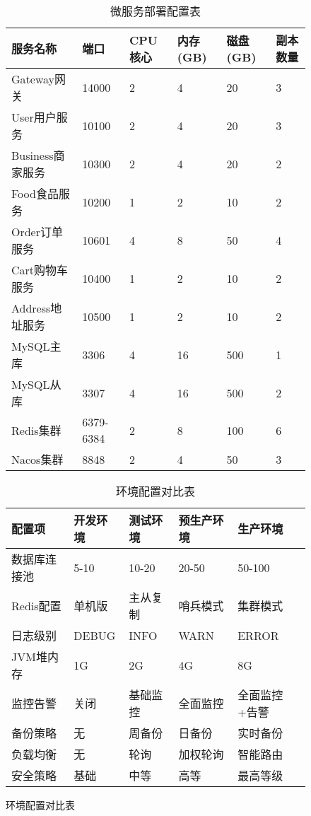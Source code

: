 \documentclass[a4paper,12pt]{article}
\begin{document}
\begin{figure}[H]
\begin{table}[H]
\centering
\caption{微服务部署配置表}
\begin{tabular}{|p{2.5cm}|p{1.5cm}|p{2cm}|p{2cm}|p{2cm}|p{3cm}|}
\hline
\textbf{服务名称} & \textbf{端口} & \textbf{CPU核心} & \textbf{内存(GB)} & \textbf{磁盘(GB)} & \textbf{副本数量} \\
\hline
Gateway网关 & 14000 & 2 & 4 & 20 & 3 \\
\hline
User用户服务 & 10100 & 2 & 4 & 20 & 3 \\
\hline
Business商家服务 & 10300 & 2 & 4 & 20 & 2 \\
\hline
Food食品服务 & 10200 & 1 & 2 & 10 & 2 \\
\hline
Order订单服务 & 10601 & 4 & 8 & 50 & 4 \\
\hline
Cart购物车服务 & 10400 & 1 & 2 & 10 & 2 \\
\hline
Address地址服务 & 10500 & 1 & 2 & 10 & 2 \\
\hline
MySQL主库 & 3306 & 4 & 16 & 500 & 1 \\
\hline
MySQL从库 & 3307 & 4 & 16 & 500 & 2 \\
\hline
Redis集群 & 6379-6384 & 2 & 8 & 100 & 6 \\
\hline
Nacos集群 & 8848 & 2 & 4 & 50 & 3 \\
\hline
\end{tabular}
\end{table}

\begin{table}[H]
\centering
\caption{环境配置对比表}
\begin{tabular}{|p{2cm}|p{3cm}|p{3cm}|p{3cm}|p{3cm}|}
\hline
\textbf{配置项} & \textbf{开发环境} & \textbf{测试环境} & \textbf{预生产环境} & \textbf{生产环境} \\
\hline
数据库连接池 & 5-10 & 10-20 & 20-50 & 50-100 \\
\hline
Redis配置 & 单机版 & 主从复制 & 哨兵模式 & 集群模式 \\
\hline
日志级别 & DEBUG & INFO & WARN & ERROR \\
\hline
JVM堆内存 & 1G & 2G & 4G & 8G \\
\hline
监控告警 & 关闭 & 基础监控 & 全面监控 & 全面监控+告警 \\
\hline
备份策略 & 无 & 周备份 & 日备份 & 实时备份 \\
\hline
负载均衡 & 无 & 轮询 & 加权轮询 & 智能路由 \\
\hline
安全策略 & 基础 & 中等 & 高等 & 最高等级 \\
\hline
\end{tabular}
\end{table}


\end{figure}
\end{document}
